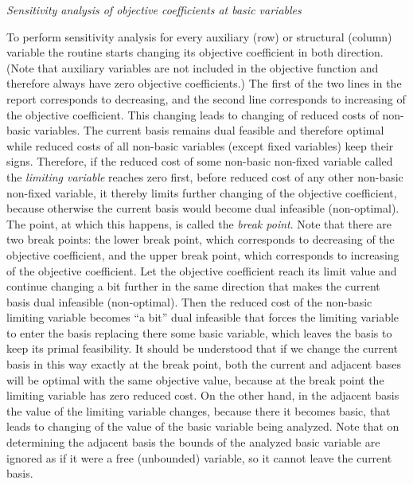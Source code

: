 {\parskip=0pt
\noindent
{\it Sensitivity analysis of objective coefficients at basic variables}

\medskip

To perform sensitivity analysis for every auxiliary (row) or structural
(column) variable the routine starts changing its objective coefficient
in both direction. (Note that auxiliary variables are not included in
the objective function and therefore always have zero objective
coefficients.) The first of the two lines in the report corresponds to
decreasing, and the second line corresponds to increasing of the
objective coefficient. This changing leads to changing of reduced costs
of non-basic variables. The current basis remains dual feasible and
therefore optimal while reduced costs of all non-basic variables
(except fixed variables) keep their signs. Therefore, if the reduced
cost of some non-basic non-fixed variable called the {\it limiting
variable} reaches zero first, before reduced cost of any other
non-basic non-fixed variable, it thereby limits further changing of the
objective coefficient, because otherwise the current basis would become
dual infeasible (non-optimal). The point, at which this happens, is
called the {\it break point}. Note that there are two break points: the
lower break point, which corresponds to decreasing of the objective
coefficient, and the upper break point, which corresponds to increasing
of the objective coefficient. Let the objective coefficient reach its
limit value and continue changing a bit further in the same direction
that makes the current basis dual infeasible (non-optimal). Then the
reduced cost of the non-basic limiting variable becomes ``a bit'' dual
infeasible that forces the limiting variable to enter the basis
replacing there some basic variable, which leaves the basis to keep its
primal feasibility. It should be understood that if we change the
current basis in this way exactly at the break point, both the current
and adjacent bases will be optimal with the same objective value,
because at the break point the limiting variable has zero reduced cost.
On the other hand, in the adjacent basis the value of the limiting
variable changes, because there it becomes basic, that leads to
changing of the value of the basic variable being analyzed. Note that
on determining the adjacent basis the bounds of the analyzed basic
variable are ignored as if it were a free (unbounded) variable, so it
cannot leave the current basis.

}
